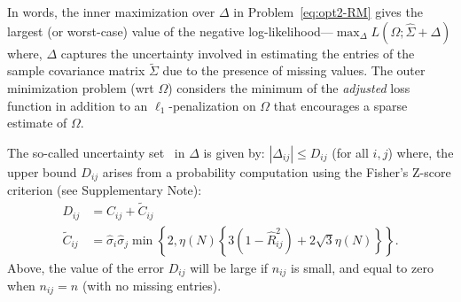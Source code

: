In words, the inner maximization over $\Delta$ in Problem~\eqref{eq:opt2-RM} gives the largest (or worst-case) value of the negative log-likelihood---$\max_{\Delta} L(\Omega; \hat{\Sigma} + \Delta)$
where, $\Delta$ captures the uncertainty involved in estimating the entries of the sample covariance matrix $\tilde{\Sigma}$ due to the presence of missing values. 
The outer minimization problem (wrt $\Omega$) considers the minimum of the \emph{adjusted} loss function
in addition to an $\ell_{1}$-penalization on $\Omega$ that encourages a 
sparse estimate of $\Omega$.

The so-called uncertainty set~\cite{bertsimas2011theory} in $\Delta$ is given by: $|\Delta_{ij}| \leq D_{ij}$ (for all $i,j$)
where, the upper bound $D_{ij}$ arises from a probability computation using the Fisher's Z-score criterion (see Supplementary Note):
\begin{equation}\label{eq:defineD}
\begin{aligned}
    D_{ij} & = C_{ij} + \tilde{C}_{ij} \\
    \tilde{C}_{ij} & = \hat{\sigma}_{i} \hat{\sigma}_{j} \min \left \{2,  \eta (N) \left \{ 3 (1 - \hat{R}^2_{ij}) + 2 \sqrt{3} \eta (N) \right \} \right \}.
\end{aligned}
\end{equation}
Above, the value of the error $D_{ij}$ will be large if $n_{ij}$ is small, and equal to zero when $n_{ij}=n$ (with no missing entries). 

